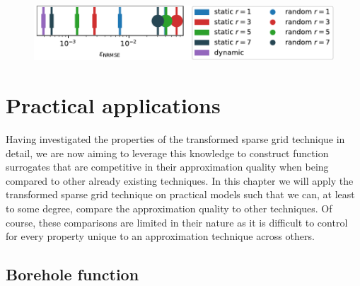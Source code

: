\documentclass[
  a4paper,  %
  twoside,  %
  bibliography=totoc,
  headsepline,
  cleardoublepage=empty,
  parskip=half,
  draft=false
]{scrbook}
\begin{document}
\begin{mdframed}[style=style]
\begin{figure}[H]
\vspace{-2mm}
\includegraphics[width=\textwidth]{graphics/ww_compare}\vspace{-1mm}
\delimit
{}
\label{fig:ww_comp}
\end{figure}
\end{mdframed}


\chapter{Practical applications}
\label{chap:c8}

Having investigated the properties of the transformed sparse grid technique in detail, we are now aiming to leverage this knowledge to construct function surrogates that are competitive in their approximation quality when being compared to other already existing techniques.
In this chapter we will apply the transformed sparse grid technique on practical models such that we can, at least to some degree, compare the approximation quality to other techniques.
Of course, these comparisons are limited in their nature as it is difficult to control for every property unique to an approximation technique across others.

\section{Borehole function}
\end{document}
